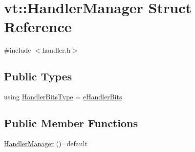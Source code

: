 \hypertarget{structvt_1_1_handler_manager}{}\section{vt\+:\+:Handler\+Manager Struct Reference}
\label{structvt_1_1_handler_manager}


{\ttfamily \#include $<$handler.\+h$>$}

\subsection*{Public Types}
\begin{DoxyCompactItemize}
\item 
using \hyperlink{structvt_1_1_handler_manager_ac2c93e168ab703b2441e0c38aa28a08f}{Handler\+Bits\+Type} = \hyperlink{namespacevt_af182285b57b225b163d5d8aff03cb8c2}{e\+Handler\+Bits}
\end{DoxyCompactItemize}
\subsection*{Public Member Functions}
\begin{DoxyCompactItemize}
\item 
\hyperlink{structvt_1_1_handler_manager_ab14c2718685b0ecd93d39b129c597ec9}{Handler\+Manager} ()=default
\end{DoxyCompactItemize}

